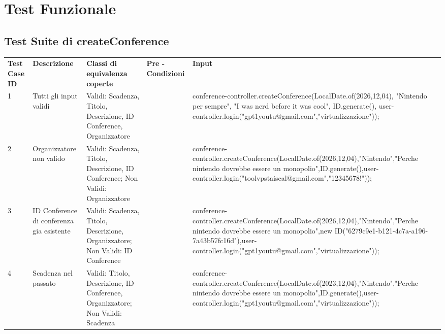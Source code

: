\section{Test Funzionale}
\label{sec:test_funzionale}

\subsection{Test Suite di createConference}
\begin{tabular}{|p{2.5cm}|p{2.5cm}|p{3cm}|p{1.5cm}|p{5cm}|}
\hline
\rowcolor{SkyBlue}
\multicolumn{5}{l}{\textbf{createConference p1}}\\
\hline
\rowcolor{Red}
\textbf{Test Case ID} & \textbf{Descrizione} & \textbf{Classi di equivalenza coperte} & \textbf{Pre - Condizioni} & \textbf{Input} \\
\hline
1&Tutti gli input validi&Validi: Scadenza, Titolo, Descrizione, ID Conference, Organizzatore &&conference-controller.createConference(LocalDate.of(2026,12,04), "Nintendo per sempre", "I was nerd before it was cool", ID.generate(), user-controller.login("gpt1youtu@gmail.com","virtualizzazione"));\\
\hline
2&Organizzatore non valido&Validi: Scadenza, Titolo, Descrizione, ID Conference; Non Validi: Organizzatore&&conference-controller.createConference(LocalDate.of(2026,12,04),"Nintendo","Perche nintendo dovrebbe essere un monopolio",ID.generate(),user-controller.login("toolvpstaiscal@gmail.com","12345678!"));\\
\hline
3&ID Conference di conferenza gia esistente&Validi: Scadenza, Titolo, Descrizione, Organizzatore; Non Validi: ID Conference &&conference-controller.createConference(LocalDate.of(2026,12,04),"Nintendo","Perche nintendo dovrebbe essere un monopolio",new ID("6279c9e1-b121-4c7a-a196-7a43b57fc16d"),user-controller.login("gpt1youtu@gmail.com","virtualizzazione"));\\
\hline
4&Scadenza nel passato&Validi: Titolo, Descrizione, ID Conference, Organizzatore; Non Validi: Scadenza  &&conference-controller.createConference(LocalDate.of(2023,12,04),"Nintendo","Perche nintendo dovrebbe essere un monopolio",ID.generate(),user-controller.login("gpt1youtu@gmail.com","virtualizzazione"));\\ 
\hline
\end{tabular}


